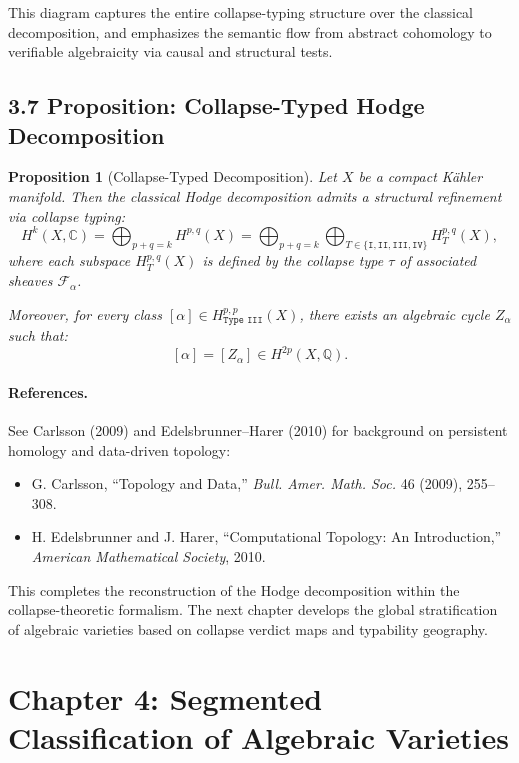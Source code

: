 \documentclass[11pt]{article}
\newtheorem{proposition}[theorem]{Proposition}
\begin{document}
This diagram captures the entire collapse-typing structure over the classical decomposition, and emphasizes the semantic flow from abstract cohomology to verifiable algebraicity via causal and structural tests.

\subsection{3.7 Proposition: Collapse-Typed Hodge Decomposition}

\begin{proposition}[Collapse-Typed Decomposition]
Let $X$ be a compact Kähler manifold. Then the classical Hodge decomposition admits a structural refinement via collapse typing:
\[
H^k(X, \mathbb{C}) = \bigoplus_{p+q=k} H^{p,q}(X) = \bigoplus_{p+q=k} \bigoplus_{T \in \{\texttt{I}, \texttt{II}, \texttt{III}, \texttt{IV}\}} H^{p,q}_T(X),
\]
where each subspace $H^{p,q}_T(X)$ is defined by the collapse type $\tau$ of associated sheaves $\mathcal{F}_\alpha$.

Moreover, for every class $[\alpha] \in H^{p,p}_{\texttt{Type III}}(X)$, there exists an algebraic cycle $Z_\alpha$ such that:
\[
[\alpha] = [Z_\alpha] \in H^{2p}(X, \mathbb{Q}).
\]
\end{proposition}

\paragraph{References.}
See Carlsson (2009) and Edelsbrunner–Harer (2010) for background on persistent homology and data-driven topology:
\begin{itemize}
  \item G. Carlsson, ``Topology and Data,'' \emph{Bull. Amer. Math. Soc.} 46 (2009), 255–308.
  \item H. Edelsbrunner and J. Harer, ``Computational Topology: An Introduction,'' \emph{American Mathematical Society}, 2010.
\end{itemize}

\bigskip

This completes the reconstruction of the Hodge decomposition within the collapse-theoretic formalism. The next chapter develops the global stratification of algebraic varieties based on collapse verdict maps and typability geography.



\section{Chapter 4: Segmented Classification of Algebraic Varieties}
\end{document}
